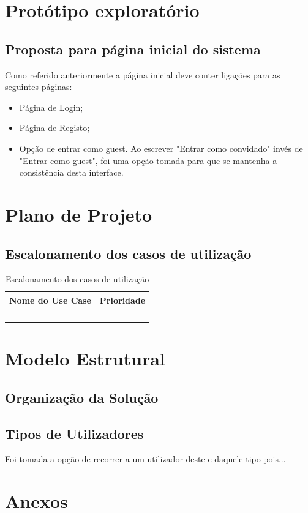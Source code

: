 \documentclass[a4paper]{article}
\begin{document}
		
		
		
		\newpage

		\section{Protótipo exploratório}
		
		\subsection{Proposta para página inicial do sistema}

		Como referido anteriormente a página inicial deve conter ligações para as seguintes páginas:
			\begin{itemize}
				\item Página de Login;
				\item Página de Registo;
				\item Opção de entrar como guest.
				\subitem Ao escrever "Entrar como convidado" invés de "Entrar como guest", foi uma opção tomada para que se mantenha a consistência desta interface. 
			\end{itemize}
		
\newpage

		
		\section{Plano de Projeto}
		
		\subsection{Escalonamento dos casos de utilização}
		\begin{table}[h]

		
			\begin{tabular}{|c|c|}
				\hline Nome do Use Case & Prioridade \\ 
				\hline &  \\ 
				\hline &  \\ 
				\hline &   \\ 
				\hline &  \\ 
				\hline 
			\end{tabular} 
			\caption{Escalonamento dos casos de utilização }
		\end{table}	
		\newpage	
		\section{Modelo Estrutural}
		
		\subsection{Organização da Solução}
		


		
		\subsection{Tipos de Utilizadores}
		
		Foi tomada a opção de recorrer a um utilizador deste e daquele tipo pois...
		
		\newpage
		
		\section{Anexos}
		
		
					
\end{document}
